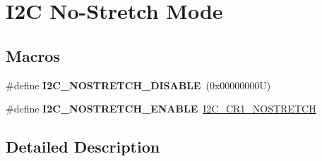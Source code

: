 \hypertarget{group___i2_c___n_o_s_t_r_e_t_c_h___m_o_d_e}{}\section{I2C No-\/\+Stretch Mode}
\label{group___i2_c___n_o_s_t_r_e_t_c_h___m_o_d_e}
\subsection*{Macros}
\begin{DoxyCompactItemize}
\item 
\mbox{\label{group___i2_c___n_o_s_t_r_e_t_c_h___m_o_d_e_ga611deefe89e56fa65f853e6796f2cf66}} 
\#define {\bfseries I2\+C\+\_\+\+N\+O\+S\+T\+R\+E\+T\+C\+H\+\_\+\+D\+I\+S\+A\+B\+LE}~(0x00000000\+U)
\item 
\mbox{\label{group___i2_c___n_o_s_t_r_e_t_c_h___m_o_d_e_ga67ebace1182d99bb5d7968994c01c80e}} 
\#define {\bfseries I2\+C\+\_\+\+N\+O\+S\+T\+R\+E\+T\+C\+H\+\_\+\+E\+N\+A\+B\+LE}~\hyperlink{group___peripheral___registers___bits___definition_ga197aaca79f64e832af3a0a0864c2a08c}{I2\+C\+\_\+\+C\+R1\+\_\+\+N\+O\+S\+T\+R\+E\+T\+CH}
\end{DoxyCompactItemize}


\subsection{Detailed Description}
